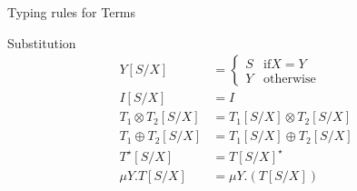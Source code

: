 \documentclass[10pt]{jsarticle}
\begin{document}
\begin{itembox}[c]{Typing rules for Terms}
    \begin{prooftree}
    \end{prooftree}

    \begin{prooftree}
    \end{prooftree}
    
    \begin{prooftree}
    \end{prooftree}

    \begin{prooftree}
    \end{prooftree}

    \begin{prooftree}
    \end{prooftree}

    \begin{prooftree}
    \end{prooftree}

    \begin{prooftree}
    \end{prooftree}
\end{itembox}

\begin{itembox}[c]{Substitution}
  \begin{align*}
    Y[S/X] &=
    \begin{cases}
      S & \text{if}X = Y \\
      Y & \text{otherwise}
    \end{cases} \\
    I[S/X] &= I \\
    T_1\otimes{}T_2[S/X] &= T_1[S/X]\otimes{}T_2[S/X] \\
    T_1\oplus{}T_2[S/X] &= T_1[S/X]\oplus{}T_2[S/X] \\
    T^\star[S/X] &= T[S/X]^\star \\
    \mu{Y}.T[S/X] &= \mu{Y}.(T[S/X])
  \end{align*}
\end{itembox}
\end{document}
